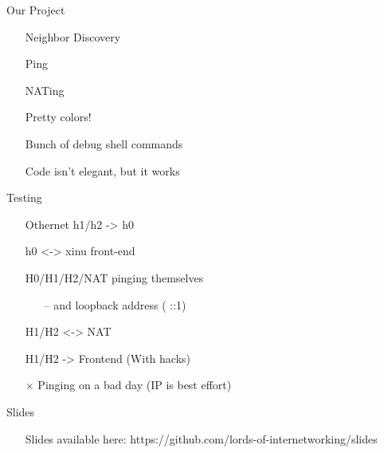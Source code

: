\documentclass[professionalfonts, t, aspectratio=1610]{beamer}
\begin{document}
\renewcommand{\baselinestretch}{1.3}
\begin{frame}{Our Project}
\begin{itemize}
\item[\textbullet] Neighbor Discovery
\pause
\item[\textbullet] Ping
\pause
\item[\textbullet] NATing
\pause
\item[\textbullet] Pretty colors!
\pause
\item[\textbullet] Bunch of debug shell commands
\pause
\item[\textbullet] Code isn't elegant, but it works
\end{itemize}
\end{frame}

\renewcommand{\baselinestretch}{1.3}
\begin{frame}{Testing}
\begin{itemize}
\item[\checkmark] Othernet h1/h2 -> h0
\pause
\item[\checkmark] h0 <-> xinu front-end
\pause
\item[\checkmark] H0/H1/H2/NAT pinging themselves
\pause
  \begin{itemize}
    \item[--] and loopback address ( ::1)
  \end{itemize}
\item[\checkmark] H1/H2 <-> NAT
\pause
\item[\checkmark] H1/H2 -> Frontend (With hacks)
\pause
\item[$\times$] Pinging on a bad day (IP is best effort)
\end{itemize}
\end{frame}

\renewcommand{\baselinestretch}{1.3}
\begin{frame}{Slides}
\begin{itemize}
\item[\textbullet] Slides available here: https://github.com/lords-of-internetworking/slides
\end{itemize}
\end{frame}



\end{document}
